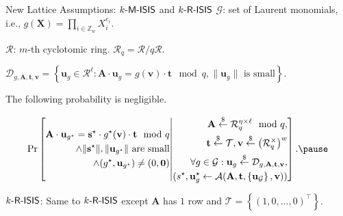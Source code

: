 \begin{frame}{New Lattice Assumptions: $k\textsf{-M-ISIS}$ and $k\textsf{-R-ISIS}$}
	$\mathcal{G}$: set of Laurent monomials, i.e., $g(\mathbf{X}) = \prod_{i\in \mathbb{Z}_w}X_i^{e_i}$.\pause
	
	$\mathcal{R}$: $m$-th cyclotomic ring. $\mathcal{R}_q = \mathcal{R}/q\mathcal{R}$.\pause
	
	$\mathcal{D}_{g, \mathbf{A}, \mathbf{t}, \mathbf{v}} = \left\{\mathbf{u}_g\in\mathcal{R}^\ell : \mathbf{A}\cdot \mathbf{u}_g = g(\mathbf{v})\cdot\mathbf{t} \mod q, \lVert\mathbf{u}_g\rVert \text{ is small}\right\}$.\pause
	
	The following probability is negligible.\pause
	
	\begin{equation*}
		\Pr\left[
		\begin{split}
			\mathbf{A}\cdot\mathbf{u}_{g^\star} = \mathbf{s}^\star \cdot g^\star(\mathbf{v})\cdot \mathbf{t}\mod q \\
			\wedge \text{$\lVert\mathbf{s}^\star\rVert, \lVert\mathbf{u}_{g^\star}\rVert$ are small}\\
			\wedge (g^\star, \mathbf{u}_{g^\star}) \not= (0, \mathbf{0})
		\end{split}
		\middle|
		\begin{split}
			\mathbf{A} \uniformly \mathcal{R}_q^{\eta\times \ell} \mod q,\\
			\mathbf{t}\uniformly\mathcal{T}, \mathbf{v}\uniformly \left(\mathcal{R}_q^\times \right)^w\\
			\forall g \in \mathcal{G}:\mathbf{u}_g \uniformly\mathcal{D}_{g, \mathbf{A}, \mathbf{t}, \mathbf{v}},\\
			(s^\star, \mathbf{u}_g^{\star} \leftarrow \adversary(\mathbf{A}, \mathbf{t}, \left\{\mathbf{u}_\mathcal{G}\right\}, \mathbf{v}))
		\end{split}
		\right].\pause
	\end{equation*}

	$k\textsf{-R-ISIS}$: Same to $k\textsf{-R-ISIS}$ except $\mathbf{A}$ has $1$ row and $\mathcal{T} = \left\{(1, 0, \dots, 0)^\top\right\}$.
\end{frame}